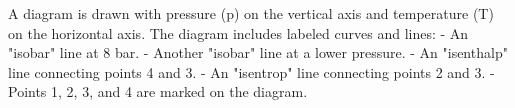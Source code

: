 A diagram is drawn with pressure (p) on the vertical axis and temperature (T) on the horizontal axis. The diagram includes labeled curves and lines:  
- An "isobar" line at 8 bar.  
- Another "isobar" line at a lower pressure.  
- An "isenthalp" line connecting points 4 and 3.  
- An "isentrop" line connecting points 2 and 3.  
- Points 1, 2, 3, and 4 are marked on the diagram.
